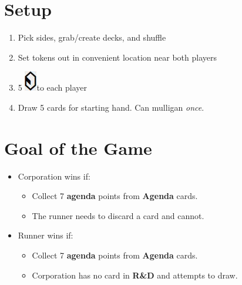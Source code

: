 \documentclass[12pt]{article}
\newenvironment{enumerateCustom}
{\begin{enumerate}
  \setlength{\itemsep}{1pt}
  \setlength{\parskip}{0pt}
  \setlength{\parsep}{0pt}}
{\end{enumerate}}
\newenvironment{itemizeCustom}
{\begin{itemize}
  \setlength{\itemsep}{1pt}
  \setlength{\parskip}{0pt}
  \setlength{\parsep}{0pt}}
{\end{itemize}}
\newcommand{\credit}{\includegraphics[scale=0.40]{images/creditLarge.jpg}\hspace{0.3em}}
\begin{document}
\begin{multicols*}{2}

\section*{Setup}
\begin{enumerateCustom}
	\item Pick sides, grab/create decks, and shuffle
	\item Set tokens out in convenient location near both players
	\item 5 \credit to each player
	\item Draw 5 cards for starting hand. Can mulligan \emph{once}.
\end{enumerateCustom}

\section*{Goal of the Game}
\begin{itemizeCustom}
	\item Corporation wins if:
		\begin{itemizeCustom}
			\item Collect 7 \textbf{agenda} points from \textbf{Agenda} cards.
			\item The runner needs to discard a card and cannot.
		\end{itemizeCustom}
	\item Runner wins if:
		\begin{itemizeCustom}
			\item Collect 7 \textbf{agenda} points from \textbf{Agenda} cards.
			\item Corporation has no card in \textbf{R\&D} and attempts to draw.
		\end{itemizeCustom}
\end{itemizeCustom}


\end{multicols*}
\end{document}
